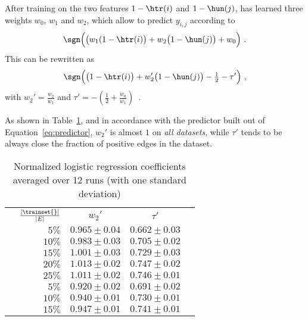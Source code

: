After training on the two features $1-\htr(i)$ and $1-\hun(j)$, \uslogregp{} has learned three weights
$w_0$, $w_1$ and $w_2$, which allow to predict $y_{i,j}$ according to 
\[ 
  \sgn\Big(\big(w_1(1-\htr(i)\big) + w_2 \big(1-\hun(j)\big) + w_0\Big)~.
\]
This can be rewritten as 
\[
\sgn\Big(\big(1-\htr(i)\big) + w_2'\big(1-\hun(j)\big) - \tfrac{1}{2} -\tau'\Big)~,
\]
with $w_2' = \frac{w_2}{w_1}$ and $\tau' = - \left(\frac{1}{2} + \frac{w_0}{w_1}\right)$~.
	
As shown in Table~\ref{tab:coeff}, and in accordance with the predictor built out of Equation~\eqref{eq:predictor},
$w_2'$ is almost $1$ on {\em all datasets}, while $\tau'$ tends to be always close the fraction of positive edges in the dataset.


\begin{table}[bt]
  \centering
  \caption{Normalized logistic regression coefficients averaged over 12 runs (with one standard deviation) \label{tab:coeff}}
  \small
\begin{tabular}{lrccc}
\toprule
                        & $\frac{|\trainset{}|}{|E|}$ &              $w_2'$ & $\tau'$ \\
\multirow{5}{*}{\aut{}} & $5\%$  &  $0.965 \pm 0.04$  &  $0.662 \pm 0.03$  \\
                        & $10\%$ &  $0.983 \pm 0.03$  &  $0.705 \pm 0.02$  \\
                        & $15\%$ &  $1.001 \pm 0.03$  &  $0.729 \pm 0.03$  \\
                        & $20\%$ &  $1.013 \pm 0.02$  &  $0.747 \pm 0.02$  \\
                        & $25\%$ &  $1.011 \pm 0.02$  &  $0.746 \pm 0.01$  \\
\midrule
\multirow{5}{*}{\wik{}} & $5\%$  &  $0.920 \pm 0.02$  &  $0.691 \pm 0.02$  \\
                        & $10\%$ &  $0.940 \pm 0.01$  &  $0.730 \pm 0.01$  \\
                        & $15\%$ &  $0.947 \pm 0.01$  &  $0.741 \pm 0.01$  \\

\end{tabular}
\end{table}
